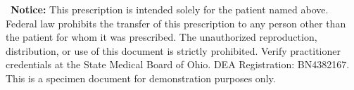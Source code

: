 \documentclass[12pt,letterpaper]{article}
\begin{document}
\vspace{6pt}

\begin{tcolorbox}[
  colback=rxblue!6,
  colframe=rxblue!30,
  sharp corners,
  boxrule=0.5pt,
  left=12pt,
  right=12pt,
  top=8pt,
  bottom=8pt,
  before skip=4pt,
  after skip=2pt
]
{\footnotesize\color{rxgray}\faExclamationTriangle\ \textbf{Notice:} This prescription is intended solely for the patient named above. Federal law prohibits the transfer of this prescription to any person other than the patient for whom it was prescribed. The unauthorized reproduction, distribution, or use of this document is strictly prohibited. Verify practitioner credentials at the State Medical Board of Ohio. DEA Registration: BN4382167. This is a specimen document for demonstration purposes only.}
\end{tcolorbox}
\end{document}
